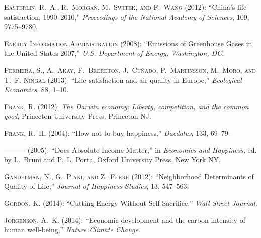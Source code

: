 \documentclass[10pt, letterpaper]{article}
\begin{document}
\begin{spacing}{1.0}
\begin{thebibliography}{49}
\textsc{Easterlin, R.~A., R.~Morgan, M.~Switek, and F.~Wang} (2012):
  \enquote{China's life satisfaction, 1990--2010,} \emph{Proceedings of the
  National Academy of Sciences}, 109, 9775--9780.

\textsc{{Energy Information Administration}} (2008): \enquote{Emissions of
  Greenhouse Gases in the United States 2007,} \emph{U.S. Department of Energy,
  Washington, DC}.

\textsc{Ferreira, S., A.~Akay, F.~Brereton, J.~Cu{\~n}ado, P.~Martinsson,
  M.~Moro, and T.~F. Ningal} (2013): \enquote{Life satisfaction and air quality
  in Europe,} \emph{Ecological Economics}, 88, 1--10.

\textsc{Frank, R.} (2012): \emph{The Darwin economy: Liberty, competition, and
  the common good}, Princeton University Press, Princeton NJ.

\textsc{Frank, R.~H.} (2004): \enquote{How not to buy happiness,}
  \emph{Daedalus}, 133, 69--79.

---\hspace{-.1pt}---\hspace{-.1pt}--- (2005): \enquote{Does Absolute Income
  Matter,} in \emph{Economics and Happiness}, ed. by L.~Bruni and P.~L. Porta,
  Oxford University Press, New York NY.

\textsc{Gandelman, N., G.~Piani, and Z.~Ferre} (2012): \enquote{Neighborhood
  Determinants of Quality of Life,} \emph{Journal of Happiness Studies}, 13,
  547--563.

\textsc{Gordon, K.} (2014): \enquote{Cutting Energy Without Self Sacrifice,}
  \emph{Wall Street Journal}.

\textsc{Jorgenson, A.~K.} (2014): \enquote{Economic development and the carbon
  intensity of human well-being,} \emph{Nature Climate Change}.


\end{thebibliography}
\end{spacing}
\end{document}
